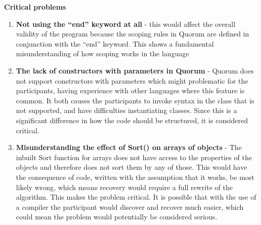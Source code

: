 \textbf{Critical problems}
\begin{enumerate}
\item \textbf{Not using the “end” keyword at all} - this would affect the overall validity of the program because the scoping rules in Quorum are defined in conjunction with the “end” keyword. This shows a fundamental misunderstanding of how scoping works in the language
\item \textbf{The lack of constructors with parameters in Quorum} - Quorum does not support constructors with parameters which might problematic for the participants, having experience with other languages where this feature is common. It both causes the participants to invoke syntax in the class that is not supported, and have difficulties instantiating classes. Since this is a significant difference in how the code should be structured, it is considered critical.
\item \textbf{Misunderstanding the effect of Sort() on arrays of objects} - The inbuilt Sort function for arrays does not have access to the properties of the objects and therefore does not sort them by any of those. This would have the consequence of code, written with the assumption that it works, be most likely wrong, which means recovery would require a full rewrite of the algorithm. This makes the problem critical. It is possible that with the use of a compiler the participant would discover and recover much easier, which could mean the problem would potentially be considered serious.
\end{enumerate}

